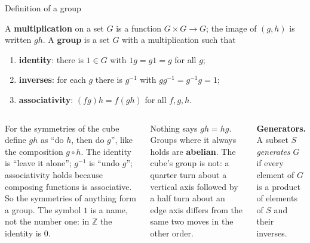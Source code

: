\documentclass[aspectratio=169,10pt]{beamer}
\newcommand{\Z}{\mathbb{Z}}
\newcommand{\inv}{^{-1}}
\begin{document}
\begin{frame}{Definition of a group}
\begin{defbox}\footnotesize
A \textbf{multiplication} on a set $G$ is a function $G\times G\to G$; the image of $(g,h)$ is written $gh$. A \textbf{group} is a set $G$ with a multiplication such that
\begin{enumerate}
\item[(i)] \textbf{identity}: there is $1\in G$ with $1g=g1=g$ for all $g$;
\item[(ii)] \textbf{inverses}: for each $g$ there is $g\inv$ with $gg\inv=g\inv g=1$;
\item[(iii)] \textbf{associativity}: $(fg)h=f(gh)$ for all $f,g,h$.
\end{enumerate}
\end{defbox}
\begin{columns}[T]
\begin{whybox}
For the symmetries of the cube define $gh$ as ``do $h$, then do $g$'', like the composition $g\circ h$. The identity is ``leave it alone''; $g\inv$ is ``undo $g$''; associativity holds because composing functions is associative. So the symmetries of anything form a group. The symbol $1$ is a name, not the number one: in $\Z$ the identity is $0$.
\end{whybox}
\begin{pitbox}
Nothing says $gh=hg$. Groups where it always holds are \textbf{abelian}. The cube's group is not: a quarter turn about a vertical axis followed by a half turn about an edge axis differs from the same two moves in the other order.
\end{pitbox}
\textbf{Generators.} A subset $S$ \emph{generates} $G$ if every element of $G$ is a product of elements of $S$ and their inverses.
\end{columns}
\end{frame}
\end{document}
